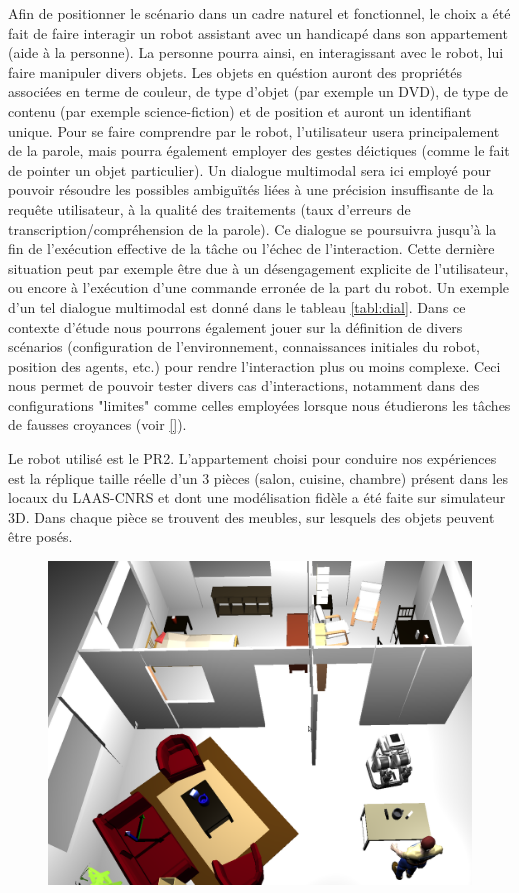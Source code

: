 \documentclass[a4paper,11pt,twoside]{StyleThese}
\begin{document}
Afin de positionner le scénario dans un cadre naturel et fonctionnel, le choix a été
fait de faire interagir un robot assistant avec un handicapé dans son appartement (aide
à la personne). La personne pourra ainsi, en interagissant avec le robot, lui faire manipuler divers objets. Les objets en quéstion auront des propriétés associées en terme de couleur, de type d'objet (par exemple un DVD), de type de contenu (par exemple science-fiction) et de position et auront un identifiant unique. Pour se faire comprendre
par le robot, l’utilisateur usera principalement de la parole, mais pourra également employer des gestes déictiques (comme le fait de pointer un objet particulier).
Un dialogue multimodal sera ici employé pour pouvoir résoudre les possibles ambiguïtés liées à une précision insuffisante de la requête utilisateur, à la qualité des traitements (taux d’erreurs de transcription/compréhension de la parole).
Ce dialogue se poursuivra jusqu’à la fin de l’exécution effective de la tâche ou
l’échec de l’interaction. Cette dernière situation peut par exemple être due à un désengagement explicite de l’utilisateur, ou encore à l’exécution d’une commande erronée
de la part du robot. Un exemple d’un tel dialogue multimodal est donné dans le tableau \ref{tabl:dial}.
Dans ce contexte d’étude nous pourrons également jouer sur la définition de divers
scénarios (configuration de l’environnement, connaissances initiales du robot, position
des agents, etc.) pour rendre l’interaction plus ou moins complexe. Ceci nous permet de
pouvoir tester divers cas d’interactions, notamment dans des configurations "limites" comme celles employées lorsque nous étudierons les tâches de fausses croyances (voir \ref{}).

Le robot utilisé est le PR2. L'appartement choisi pour conduire nos expériences est la réplique taille réelle
d’un 3 pièces (salon, cuisine, chambre) présent dans les locaux du LAAS-CNRS et dont une modélisation fidèle a été faite sur simulateur 3D.
Dans chaque pièce se trouvent des meubles, sur lesquels des objets peuvent être posés.



\begin{figure}[ht!]
 \centering
  \includegraphics[width=0.89\linewidth]{./img/LAASMORSE.png} 
  \caption {}
  \label{fig:morse}
\end{figure}
\end{document}
